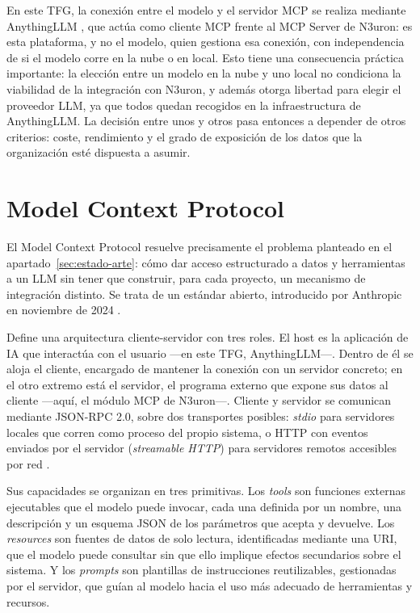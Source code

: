 En este TFG, la conexión entre el modelo y el servidor MCP se realiza
mediante AnythingLLM \cite{anythingllm-docs}, que actúa como cliente MCP
frente al MCP Server de N3uron: es esta plataforma, y no el modelo, quien
gestiona esa conexión, con independencia de si el modelo corre en la nube o
en local. Esto tiene una consecuencia práctica importante: la elección
entre un modelo en la nube y uno local no condiciona la viabilidad de la
integración con N3uron, y además otorga libertad para elegir el proveedor
LLM, ya que todos quedan recogidos en la infraestructura de AnythingLLM. La
decisión entre unos y otros pasa entonces a depender de otros criterios:
coste, rendimiento y el grado de exposición de los datos que la
organización esté dispuesta a asumir.

\section{Model Context Protocol}
\label{sec:model-context-protocol}

El Model Context Protocol resuelve precisamente el problema planteado en el
apartado~\ref{sec:estado-arte}: cómo dar acceso estructurado a datos y
herramientas a un LLM sin tener que construir, para cada proyecto, un
mecanismo de integración distinto. Se trata de un estándar abierto,
introducido por Anthropic en noviembre de 2024 \cite{mcp-docs}.

Define una arquitectura cliente-servidor con tres roles. El host es la
aplicación de IA que interactúa con el usuario —en este TFG, AnythingLLM—.
Dentro de él se aloja el cliente, encargado de mantener la conexión con un
servidor concreto; en el otro extremo está el servidor, el programa externo
que expone sus datos al cliente —aquí, el módulo MCP de N3uron—. Cliente y
servidor se comunican mediante JSON-RPC 2.0, sobre dos transportes
posibles: \emph{stdio} para servidores locales que corren como proceso del propio
sistema, o HTTP con eventos enviados por el servidor (\emph{streamable HTTP}) para
servidores remotos accesibles por red \cite{mcp-architecture}.

Sus capacidades se organizan en tres primitivas. Los \emph{tools} son
funciones externas ejecutables que el modelo puede invocar, cada una
definida por un nombre, una descripción y un esquema JSON de los parámetros
que acepta y devuelve. Los \emph{resources} son fuentes de datos de solo
lectura, identificadas mediante una URI, que el modelo puede consultar sin
que ello implique efectos secundarios sobre el sistema. Y los
\emph{prompts} son plantillas de instrucciones reutilizables, gestionadas
por el servidor, que guían al modelo hacia el uso más adecuado de
herramientas y recursos.

